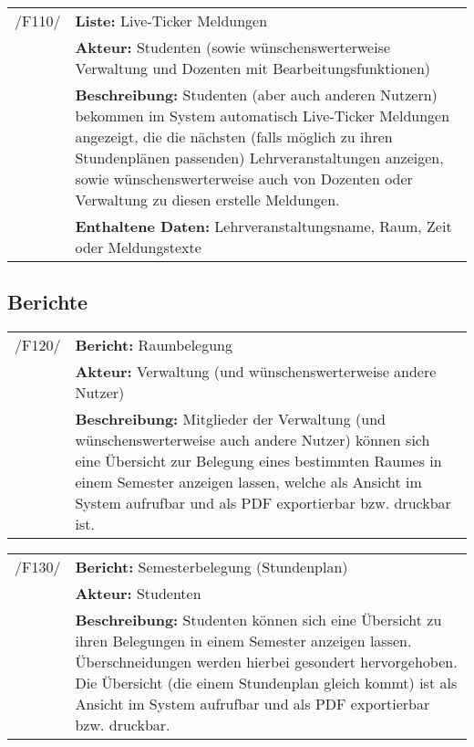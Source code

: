 \begin{tabular}{p{1.5cm}p{14.5cm}}
	
	 /F110/& \textbf{Liste:} Live-Ticker Meldungen \\
				& \textbf{Akteur:} Studenten (sowie wünschenswerterweise Verwaltung und Dozenten mit Bearbeitungsfunktionen) \\
				& \textbf{Beschreibung:} Studenten (aber auch anderen Nutzern) bekommen im System automatisch Live-Ticker Meldungen angezeigt, die die nächsten (falls möglich zu ihren Stundenplänen passenden) Lehrveranstaltungen anzeigen, sowie wünschenswerterweise auch von Dozenten oder Verwaltung zu diesen erstelle Meldungen.\\
				& \textbf{Enthaltene Daten:} Lehrveranstaltungsname, Raum, Zeit oder Meldungstexte \\[0.25cm]

				
\end{tabular}


\subsection{Berichte}


\begin{tabular}{p{1.5cm}p{14.5cm}}


	 /F120/& \textbf{Bericht:} Raumbelegung \\
				& \textbf{Akteur:} Verwaltung (und wünschenswerterweise andere Nutzer) \\
				& \textbf{Beschreibung:} Mitglieder der Verwaltung (und wünschenswerterweise auch andere Nutzer) können sich eine Übersicht zur Belegung eines bestimmten Raumes in einem Semester anzeigen lassen, welche als Ansicht im System aufrufbar und als PDF exportierbar bzw. druckbar ist. \\[0.25cm]

\end{tabular}


\begin{tabular}{p{1.5cm}p{14.5cm}}
	
	 /F130/& \textbf{Bericht:} Semesterbelegung (Stundenplan) \\
				& \textbf{Akteur:} Studenten \\
				& \textbf{Beschreibung:} Studenten können sich eine Übersicht zu ihren Belegungen in einem Semester anzeigen lassen. Überschneidungen werden hierbei gesondert hervorgehoben. Die Übersicht (die einem Stundenplan gleich kommt) ist als Ansicht im System aufrufbar und als PDF exportierbar bzw. druckbar. \\[0.25cm]

				
\end{tabular}


